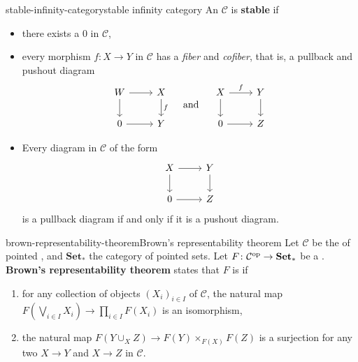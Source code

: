 \begin{topic}{stable-infinity-category}{stable infinity category}
    An  $\mathcal{C}$ is \textbf{stable} if
    \begin{itemize}
        \item there exists a  $0$ in $\mathcal{C}$,
        \item every morphism $f \colon X \to Y$ in $\mathcal{C}$ has a \textit{fiber} and \textit{cofiber}, that is, a pullback and pushout diagram
        \[ \svg \begin{tikzcd} W \arrow{r} \arrow{d} & X \arrow{d}{f} \\ 0 \arrow{r} & Y \end{tikzcd} \quad \textup{ and } \quad \begin{tikzcd} X \arrow{r}{f} \arrow{d} & Y \arrow{d} \\ 0 \arrow{r} & Z \end{tikzcd} \]
        \item Every diagram in $\mathcal{C}$ of the form
        \[ \svg \begin{tikzcd} X \arrow{r} \arrow{d} & Y \arrow{d} \\ 0 \arrow{r} & Z \end{tikzcd} \]
        is a pullback diagram if and only if it is a pushout diagram.
    \end{itemize}
\end{topic}

\begin{topic}{brown-representability-theorem}{Brown's representability theorem}
    Let $\mathcal{C}$ be the  of  pointed , and $\textbf{Set}_*$ the category of pointed sets. Let $F \colon \mathcal{C}^\textup{op} \to \textbf{Set}_*$ be a . \textbf{Brown's representability theorem} states that $F$ is  if
    \begin{enumerate}[label=(\roman*)]
        \item for any collection of objects $(X_i)_{i \in I}$ of $\mathcal{C}$, the natural map $F(\bigvee_{i \in I} X_i) \to \prod_{i \in I} F(X_i)$ is an isomorphism,
        \item the natural map $F(Y \cup_X Z) \to F(Y) \times_{F(X)} F(Z)$ is a surjection for any two  $X \to Y$ and $X \to Z$ in $\mathcal{C}$.
    \end{enumerate}
\end{topic}

